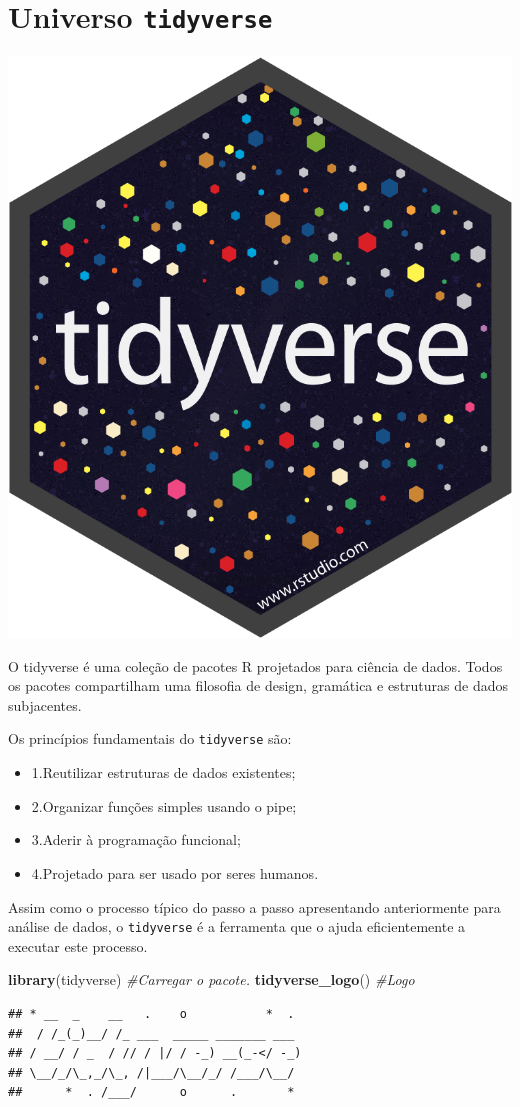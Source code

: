 \documentclass[]{book}
\newenvironment{Shaded}{\begin{snugshade}}{\end{snugshade}}
\newcommand{\CommentTok}[1]{\textcolor[rgb]{0.56,0.35,0.01}{\textit{#1}}}
\newcommand{\KeywordTok}[1]{\textcolor[rgb]{0.13,0.29,0.53}{\textbf{#1}}}
\newcommand{\NormalTok}[1]{#1}
\providecommand{\tightlist}{%
  \setlength{\itemsep}{0pt}\setlength{\parskip}{0pt}}
\begin{document}
\hypertarget{universo-tidyverse}{%
\section{\texorpdfstring{Universo \texttt{tidyverse}}{Universo tidyverse}}\label{universo-tidyverse}}

\begin{center}\includegraphics[width=0.25\linewidth]{imagens/hex-tidyverse} \end{center}

O tidyverse é uma coleção de pacotes R projetados para ciência de dados. Todos os pacotes compartilham uma filosofia de design, gramática e estruturas de dados subjacentes.

Os princípios fundamentais do \texttt{tidyverse} são:

\begin{itemize}
\tightlist
\item
  1.Reutilizar estruturas de dados existentes;
\item
  2.Organizar funções simples usando o pipe;
\item
  3.Aderir à programação funcional;
\item
  4.Projetado para ser usado por seres humanos.
\end{itemize}

Assim como o processo típico do passo a passo apresentando anteriormente para análise de dados, o \texttt{tidyverse} é a ferramenta que o ajuda eficientemente a executar este processo.

\begin{Shaded}
\begin{Highlighting}[]
\KeywordTok{library}\NormalTok{(tidyverse) }\CommentTok{#Carregar o pacote.}
\KeywordTok{tidyverse_logo}\NormalTok{() }\CommentTok{#Logo}
\end{Highlighting}
\end{Shaded}

\begin{verbatim}
## * __  _    __   .    o           *  . 
##  / /_(_)__/ /_ ___  _____ _______ ___ 
## / __/ / _  / // / |/ / -_) __(_-</ -_)
## \__/_/\_,_/\_, /|___/\__/_/ /___/\__/ 
##      *  . /___/      o      .       *
\end{verbatim}
\end{document}
